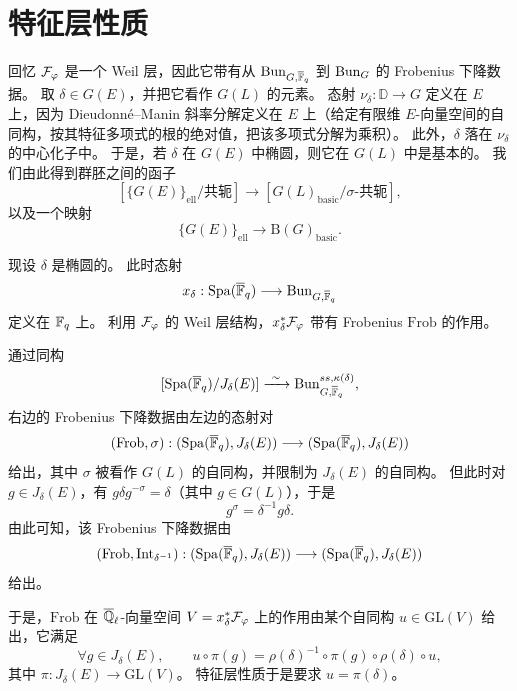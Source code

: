 
\section{特征层性质}
\label{sec:character}

回忆 $\mathcal{F}_\varphi$ 是一个 Weil 层，因此它带有从 $\mathrm{Bun}_{G,\overline{\mathbb{F}}_q}$ 到 $\mathrm{Bun}_G$ 的 Frobenius 下降数据。
取 $\delta\in G(E)$，并把它看作 $G(L)$ 的元素。
态射 $\nu_\delta:\mathbb{D}\to G$ 定义在 $E$ 上，因为 Dieudonné--Manin 斜率分解定义在 $E$ 上（给定有限维 $E$-向量空间的自同构，按其特征多项式的根的绝对值，把该多项式分解为乘积）。
此外，$\delta$ 落在 $\nu_\delta$ 的中心化子中。
于是，若 $\delta$ 在 $G(E)$ 中椭圆，则它在 $G(L)$ 中是基本的。
我们由此得到群胚之间的函子
\[
[\{G(E)\}_{\mathrm{ell}}/\text{共轭}]
\longrightarrow
[G(L)_{\mathrm{basic}}/\sigma\text{-共轭}],
\]
以及一个映射
\[
\{G(E)\}_{\mathrm{ell}}\longrightarrow \mathrm{B}(G)_{\mathrm{basic}}.
\]

现设 $\delta$ 是椭圆的。
此时态射
\[
x_\delta:\mathrm{Spa}(\overline{\mathbb{F}}_q)\longrightarrow \mathrm{Bun}_{G,\overline{\mathbb{F}}_q}
\]
定义在 $\mathbb{F}_q$ 上。
利用 $\mathcal{F}_\varphi$ 的 Weil 层结构，$x_\delta^*\mathcal{F}_\varphi$ 带有 Frobenius $\mathrm{Frob}$ 的作用。

通过同构
\[
[\mathrm{Spa}(\overline{\mathbb{F}}_q)/J_\delta(E)]
\xrightarrow{\ \sim\ }
\mathrm{Bun}^{ss,\kappa(\delta)}_{G,\overline{\mathbb{F}}_q},
\]
右边的 Frobenius 下降数据由左边的态射对
\[
(\mathrm{Frob},\sigma):(\mathrm{Spa}(\overline{\mathbb{F}}_q),J_\delta(E))
\longrightarrow(\mathrm{Spa}(\overline{\mathbb{F}}_q),J_\delta(E))
\]
给出，其中 $\sigma$ 被看作 $G(L)$ 的自同构，并限制为 $J_\delta(E)$ 的自同构。
但此时对 $g\in J_\delta(E)$，有 $g\delta g^{-\sigma}=\delta$（其中 $g\in G(L)$），于是
\[
g^\sigma=\delta^{-1}g\delta.
\]
由此可知，该 Frobenius 下降数据由
\[
(\mathrm{Frob},\mathrm{Int}_{\delta^{-1}}):(\mathrm{Spa}(\overline{\mathbb{F}}_q),J_\delta(E))
\longrightarrow(\mathrm{Spa}(\overline{\mathbb{F}}_q),J_\delta(E))
\]
给出。

于是，$\mathrm{Frob}$ 在 $\overline{\mathbb{Q}}_\ell$-向量空间 $V=x_\delta^*\mathcal{F}_\varphi$ 上的作用由某个自同构 $u\in\mathrm{GL}(V)$ 给出，它满足
\[
\forall g\in J_\delta(E),\qquad
u\circ\pi(g)=\rho(\delta)^{-1}\circ\pi(g)\circ\rho(\delta)\circ u,
\]
其中 $\pi:J_\delta(E)\to\mathrm{GL}(V)$。
特征层性质于是要求 $u=\pi(\delta)$。


